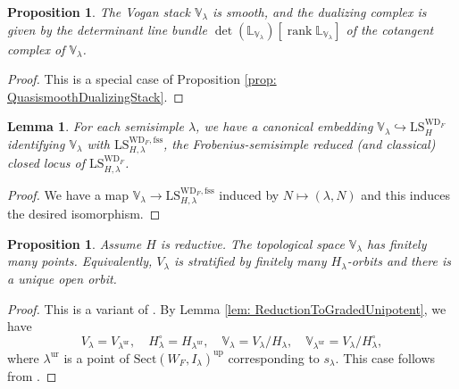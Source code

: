 \documentclass{amsart}
\newtheorem{lemma}[theorem]{Lemma}
\newtheorem{proposition}[theorem]{Proposition}
\theoremstyle{definition}
\theoremstyle{remark}
\numberwithin{equation}{section}
\DeclareMathOperator{\rank}{rank}
\newcommand{\fss}{\mathrm{fss}}
\newcommand{\ur}{\mathrm{ur}}
\newcommand{\V}{\mathbb{V}}
\newcommand{\up}{\mathrm{up}}
\renewcommand{\L}{\mathbb{L}}
\newcommand{\WD}{\mathrm{WD}}
\newcommand{\LS}{\mathrm{LS}}
\newcommand{\Sect}{\mathrm{Sect}}
\begin{document}
\begin{proposition}{\label{prop: cotangentdualizingcomplex}}
The Vogan stack $\V_{\lambda}$ is smooth, and the dualizing complex is given by the determinant line bundle $\det(\L_{\V_{\lambda}})[\rank \L_{\V_{\lambda}}]$ of the cotangent complex of $\V_{\lambda}$.
\end{proposition}

\begin{proof}
This is a special case of Proposition \ref{prop: QuasismoothDualizingStack}.
\end{proof}

\begin{lemma}
For each semisimple $\lambda$, we have a canonical embedding $\V_{\lambda} \hookrightarrow \LS^{\WD_F}_H$ identifying $\V_{\lambda}$ with $\LS^{\WD_F, \fss}_{H, \lambda}$, the Frobenius-semisimple reduced (and classical) closed locus of $\LS^{\WD_F}_{H, \lambda}$.
\end{lemma}
\begin{proof}
    We have a map $\V_\lambda\to \LS^{\WD_F, \fss}_{H, \lambda}$ induced by $N\mapsto (\lambda, N)$ and this induces the desired isomorphism.
\end{proof}

\begin{proposition}
Assume $H$ is reductive. The topological space $\V_{\lambda}$ has finitely many points. Equivalently, $V_{\lambda}$ is stratified by finitely many $H_{\lambda}$-orbits and there is a unique open orbit.
\end{proposition}

\begin{proof}
This is a variant of \cite[Proposition 5.6]{CFMMX}. 
By Lemma \ref{lem: ReductionToGradedUnipotent}, we have 
\[
V_\lambda=V_{\lambda^\ur}, \quad H^{\circ}_\lambda = H_{\lambda^\ur}, \quad \V_\lambda=V_\lambda/H_\lambda, \quad \V_{\lambda^\ur}=V_\lambda/ H_{\lambda}^\circ, 
\]
where $\lambda^{\ur}$ is a point of $\Sect (W_F, I_\lambda)^{\up}$ corresponding to $s_\lambda$. This case follows from \cite[Proposition 3.5, \S3.6]{LusztigGraded}. 
\end{proof}
\end{document}
